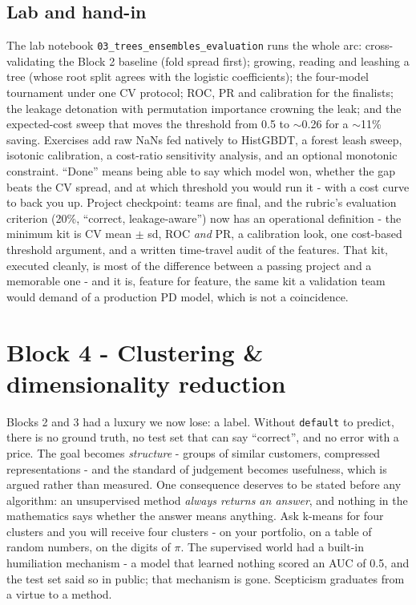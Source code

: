 \documentclass[11pt,a4paper]{article}
\begin{document}
\subsection{Lab and hand-in}
The lab notebook \texttt{03\_trees\_ensembles\_evaluation} runs the whole
arc: cross-validating the Block 2 baseline (fold spread first); growing,
reading and leashing a tree (whose root split agrees with the logistic
coefficients); the four-model tournament under one CV protocol; ROC, PR and
calibration for the finalists; the leakage detonation with permutation
importance crowning the leak; and the expected-cost sweep that moves the
threshold from 0.5 to $\sim$0.26 for a $\sim$11\% saving. Exercises add raw
NaNs fed natively to HistGBDT, a forest leash sweep, isotonic calibration,
a cost-ratio sensitivity analysis, and an optional monotonic constraint.
``Done'' means being able to say which model won, whether the gap beats the
CV spread, and at which threshold you would run it - with a cost curve to
back you up. Project checkpoint: teams are final, and the rubric's
evaluation criterion (20\%, ``correct, leakage-aware'') now has an
operational definition - the minimum kit is CV mean $\pm$ sd, ROC
\emph{and} PR, a calibration look, one cost-based threshold argument, and a
written time-travel audit of the features. That kit, executed cleanly,
is most of the difference between a passing project and a memorable
one - and it is, feature for feature, the same kit a validation team
would demand of a production PD model, which is not a coincidence.

\section{Block 4 - Clustering \& dimensionality reduction}

Blocks 2 and 3 had a luxury we now lose: a label. Without
\texttt{default} to predict, there is no ground truth, no test set that can
say ``correct'', and no error with a price. The goal becomes
\emph{structure} - groups of similar customers, compressed
representations - and the standard of judgement becomes usefulness,
which is argued rather than measured. One consequence deserves to be
stated before any algorithm: an unsupervised method \emph{always returns
an answer}, and nothing in the mathematics says whether the answer means
anything. Ask k-means for four clusters and you will receive four
clusters - on your portfolio, on a table of random numbers, on the
digits of $\pi$. The supervised world had a built-in humiliation
mechanism - a model that learned nothing scored an AUC of 0.5, and the
test set said so in public; that mechanism is gone. Scepticism
graduates from a virtue to a method.
\end{document}

